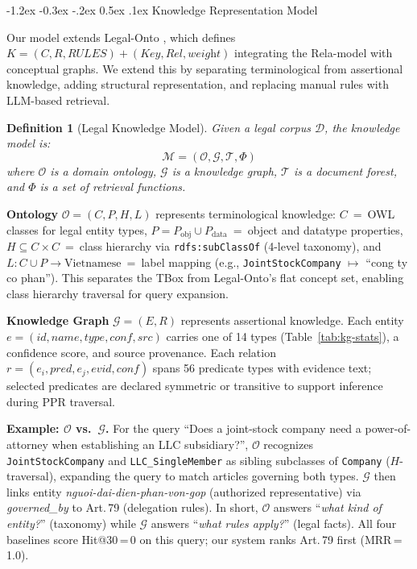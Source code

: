 \documentclass{IOS-Book-Article}
\makeatletter
\newtheorem{definition}{Definition}
\renewcommand\subsection{\@startsection{subsection}{2}{\z@}%
  {-1.2ex \@plus -0.3ex \@minus -.2ex}%
  {0.5ex \@plus .1ex}%
  {\normalfont\normalsize\bfseries}}
\makeatother
\begin{document}
\subsection{Knowledge Representation Model}

Our model extends Legal-Onto \cite{r8}, which defines $K = (C, R, \textit{RULES}) + (\textit{Key}, \textit{Rel}, \textit{weight})$ integrating the Rela-model \cite{r21} with conceptual graphs. We extend this by separating terminological from assertional knowledge, adding structural representation, and replacing manual rules with LLM-based retrieval.

\begin{definition}[Legal Knowledge Model]
Given a legal corpus $\mathcal{D}$, the knowledge model is:
\begin{equation}
\mathcal{M} = (\mathcal{O}, \mathcal{G}, \mathcal{T}, \Phi)
\end{equation}
where $\mathcal{O}$ is a domain ontology, $\mathcal{G}$ is a knowledge graph, $\mathcal{T}$ is a document forest, and $\Phi$ is a set of retrieval functions.
\end{definition}

\textbf{Ontology} $\mathcal{O} = (C, P, H, L)$ represents terminological knowledge: $C$~=~OWL classes for legal entity types, $P = P_\text{obj} \cup P_\text{data}$~=~object and datatype properties, $H \subseteq C \times C$~=~class hierarchy via \texttt{rdfs:subClassOf} (4-level taxonomy), and $L: C \cup P \to \text{Vietnamese}$~=~label mapping (e.g., \texttt{JointStockCompany} $\mapsto$ ``cong ty co phan''). This separates the TBox from Legal-Onto's flat concept set, enabling class hierarchy traversal for query expansion.

\textbf{Knowledge Graph} $\mathcal{G} = (E, R)$ represents assertional knowledge. Each entity $e = (\textit{id}, \textit{name}, \textit{type}, \textit{conf}, \textit{src})$ carries one of 14 types (Table~\ref{tab:kg-stats}), a confidence score, and source provenance. Each relation $r = (e_i, \textit{pred}, e_j, \textit{evid}, \textit{conf})$ spans 56 predicate types with evidence text; selected predicates are declared symmetric or transitive to support inference during PPR traversal.

\textbf{Example: $\mathcal{O}$ vs.\ $\mathcal{G}$.} For the query ``Does a joint-stock company need a power-of-attorney when establishing an LLC subsidiary?'', $\mathcal{O}$ recognizes \texttt{JointStockCompany} and \texttt{LLC\_SingleMember} as sibling subclasses of \texttt{Company} ($H$-traversal), expanding the query to match articles governing both types. $\mathcal{G}$ then links entity \textit{nguoi-dai-dien-phan-von-gop} (authorized representative) via \textit{governed\_by} to Art.\,79 (delegation rules). In short, $\mathcal{O}$ answers ``\textit{what kind of entity?}'' (taxonomy) while $\mathcal{G}$ answers ``\textit{what rules apply?}'' (legal facts). All four baselines score Hit@30\,=\,0 on this query; our system ranks Art.\,79 first (MRR\,=\,1.0).
\end{document}
